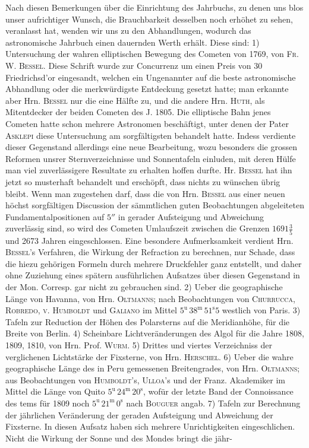 Nach diesen Bemerkungen über die Einrichtung des Jahrbuchs, zu denen uns blos unser aufrichtiger Wunsch, die Brauchbarkeit desselben noch erhöhet zu sehen, veranlasst hat, wenden wir uns zu den Abhandlungen, wodurch das astronomische Jahrbuch einen dauernden Werth erhält. Diese sind: 1) Untersuchung der wahren elliptischen Bewegung des Cometen von 1769, von \textsc{Fr. W. Bessel}. Diese Schrift wurde zur Concurrenz um einen Preis von 30 Friedrichsd'or eingesandt, welchen ein Ungenannter auf die beste astronomische Abhandlung oder die merkwürdigste Entdeckung gesetzt hatte; man erkannte aber Hrn. \textsc{Bessel} nur die eine Hälfte zu, und die andere Hrn. \textsc{Huth}, als Mitentdecker der beiden Cometen des J. 1805. Die elliptische Bahn jenes Cometen hatte schon mehrere Astronomen beschäftigt, unter denen der Pater \textsc{Asklepi} diese Untersuchung am sorgfältigsten behandelt hatte. Indess verdiente dieser Gegenstand allerdings eine neue Bearbeitung, wozu besonders die grossen Reformen unsrer Sternverzeichnisse und Sonnentafeln einluden, mit deren Hülfe man viel zuverlässigere Resultate zu erhalten hoffen durfte. Hr. \textsc{Bessel} hat ihn jetzt so musterhaft behandelt und erschöpft, dass nichts zu wünschen übrig bleibt. Wenn man zugestehen darf, dass die von Hrn. \textsc{Bessel} aus einer neuen höchst sorgfältigen Discussion der sämmtlichen guten Beobachtungen abgeleiteten Fundamentalpositionen auf $5''$ in gerader Aufsteigung und Abweichung zuverlässig sind, so wird des Cometen Umlaufszeit zwischen die Grenzen $1691\frac{3}{5}$ und 2673 Jahren eingeschlossen. Eine besondere Aufmerksamkeit verdient Hrn. \textsc{Bessel}'s Verfahren, die Wirkung der Refraction zu berechnen, nur Schade, dass die hiezu gehörigen Formeln durch mehrere Druckfehler ganz entstellt, und daher ohne Zuziehung eines spätern ausführlichen Aufsatzes über diesen Gegenstand in der Mon. Corresp. gar nicht zu gebrauchen sind. 2) Ueber die geographische Länge von Havanna, von Hrn. \textsc{Oltmanns}; nach Beobachtungen von \textsc{Churrucca}, \textsc{Robredo}, \textsc{v. Humboldt} und \textsc{Galiano} im Mittel $5^{\mathrm u}\,38^{\mathrm m}\,51^{\mathrm s}5$ westlich von Paris. 3) Tafeln zur Reduction der Höhen des Polarsterns auf die Meridianhöhe, für die Breite von Berlin. 4) Scheinbare Lichtveränderungen des Algol für die Jahre 1808, 1809, 1810, von Hrn. Prof. \textsc{Wurm}. 5) Drittes und viertes Verzeichniss der verglichenen Lichtstärke der Fixsterne, von Hrn. \textsc{Herschel}. 6) Ueber die wahre geographische Länge des in Peru gemessenen Breitengrades, von Hrn. \textsc{Oltmanns}; aus Beobachtungen von \textsc{Humboldt}'s, \textsc{Ulloa}'s und der Franz. Akademiker im Mittel die Länge von Quito $5^{\mathrm u}\,24^{\mathrm m}\,20^{\mathrm s}$, wofür der letzte Band der Connoissance des tems für 1809 noch $5^{\mathrm u}\,21^{\mathrm m}\,0^{\mathrm s}$ nach \textsc{Bouguer} angab. 7) Tafeln zur Berechnung der jährlichen Veränderung der geraden Aufsteigung und Abweichung der Fixsterne. In diesen Aufsatz haben sich mehrere Unrichtigkeiten eingeschlichen. Nicht die Wirkung der Sonne und des Mondes bringt die jähr-\par

